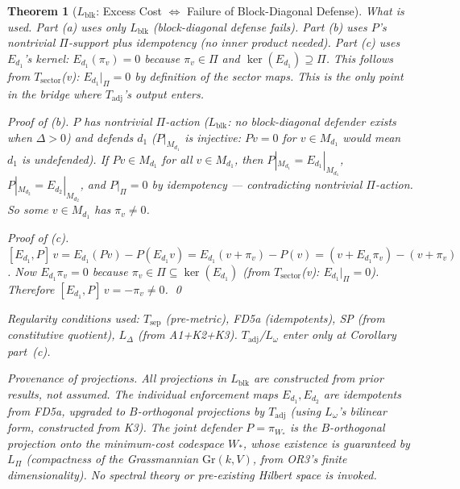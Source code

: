 \documentclass[11pt,a4paper]{article}
\newtheorem{theorem}{Theorem}[section]
\theoremstyle{definition}
\newcommand{\Gr}{\mathrm{Gr}}
\begin{document}
\begin{theorem}[$L_{\mathrm{blk}}$: Excess Cost $\Leftrightarrow$ Failure of Block-Diagonal Defense]
\noindent\textit{What is used.}  Part (a) uses only $L_{\mathrm{blk}}$ (block-diagonal defense fails).  Part (b) uses $P$'s nontrivial $\Pi$-support plus idempotency (no inner product needed).  Part (c) uses $E_{d_1}$'s kernel: $E_{d_1}(\pi_v) = 0$ because $\pi_v \in \Pi$ and $\ker(E_{d_1}) \supseteq \Pi$.  This follows from $T_{\mathrm{sector}}$(v): $E_{d_1}|_\Pi = 0$ by definition of the sector maps.  This is the \emph{only} point in the bridge where $T_{\mathrm{adj}}$'s output enters.

\smallskip
\textit{Proof of (b).}  $P$ has nontrivial $\Pi$-action ($L_{\mathrm{blk}}$: no block-diagonal defender exists when $\Delta > 0$) and defends $d_1$ ($P|_{M_{d_1}}$ is injective: $Pv = 0$ for $v \in M_{d_1}$ would mean $d_1$ is undefended).  If $Pv \in M_{d_1}$ for all $v \in M_{d_1}$, then $P|_{M_{d_1}} = E_{d_1}|_{M_{d_1}}$, $P|_{M_{d_2}} = E_{d_2}|_{M_{d_2}}$, and $P|_\Pi = 0$ by idempotency --- contradicting nontrivial $\Pi$-action.  So some $v \in M_{d_1}$ has $\pi_v \ne 0$.

\textit{Proof of (c).}  $[E_{d_1}, P]\,v = E_{d_1}(Pv) - P(E_{d_1}v) = E_{d_1}(v + \pi_v) - P(v) = (v + E_{d_1}\pi_v) - (v + \pi_v)$.  Now $E_{d_1}\pi_v = 0$ because $\pi_v \in \Pi \subseteq \ker(E_{d_1})$ (from $T_{\mathrm{sector}}$(v): $E_{d_1}|_\Pi = 0$).  Therefore $[E_{d_1}, P]\,v = -\pi_v \ne 0$.  \qed

\noindent\textit{Regularity conditions used:} $T_{\mathrm{sep}}$ (pre-metric), FD5a (idempotents), SP (from constitutive quotient), $L_\Delta$ (from A1+K2+K3).  $T_{\mathrm{adj}}$/$L_\omega$ enter only at Corollary part~(c).

\noindent\textit{Provenance of projections.}  All projections in $L_{\mathrm{blk}}$ are constructed from prior results, not assumed.  The individual enforcement maps $E_{d_1}, E_{d_2}$ are idempotents from FD5a, upgraded to $B$-orthogonal projections by $T_{\mathrm{adj}}$ (using $L_\omega$'s bilinear form, constructed from K3).  The joint defender $P = \pi_{W_*}$ is the $B$-orthogonal projection onto the minimum-cost codespace $W_*$, whose existence is guaranteed by $L_\Pi$ (compactness of the Grassmannian $\Gr(k, V)$, from OR3's finite dimensionality).  No spectral theory or pre-existing Hilbert space is invoked.
\end{theorem}
\end{document}
